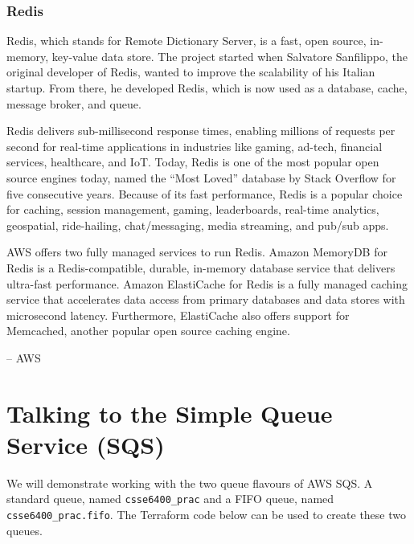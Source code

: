 \documentclass{csse4400}
\begin{document}
\subsubsection{Redis}
\begin{oldquote}
Redis, which stands for Remote Dictionary Server,
is a fast, open source, in-memory, key-value data store.
The project started when Salvatore Sanfilippo,
the original developer of Redis,
wanted to improve the scalability of his Italian startup.
From there, he developed Redis,
which is now used as a database, cache, message broker, and queue.

Redis delivers sub-millisecond response times,
enabling millions of requests per second for real-time applications in industries like gaming, ad-tech, financial services, healthcare, and IoT.
Today, Redis is one of the most popular open source engines today,
named the ``Most Loved'' database by Stack Overflow for five consecutive years.
Because of its fast performance,
Redis is a popular choice for caching, session management, gaming, leaderboards, real-time analytics, geospatial, ride-hailing, chat/messaging, media streaming, and pub/sub apps.
  
AWS offers two fully managed services to run Redis.
Amazon MemoryDB for Redis is a Redis-compatible, durable, in-memory database service that delivers ultra-fast performance.
Amazon ElastiCache for Redis is a fully managed caching service that accelerates data access from primary databases and data stores with microsecond latency.
Furthermore, ElastiCache also offers support for Memcached, another popular open source caching engine.

\raggedleft -- AWS
\end{oldquote}


\section{Talking to the Simple Queue Service (SQS)}


We will demonstrate working with the two queue flavours of AWS SQS.
A standard queue, named \texttt{csse6400\_prac} and a FIFO queue, named \texttt{csse6400\_prac.fifo}.
The Terraform code below can be used to create these two queues.
\end{document}
